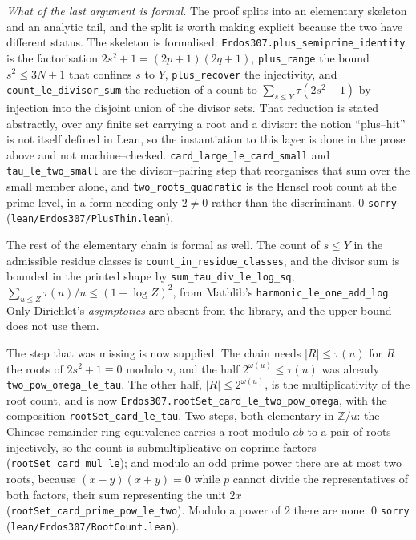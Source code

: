 \documentclass[11pt]{article}
\theoremstyle{definition}
\begin{document}
\emph{What of the last argument is formal.} The proof splits into an elementary skeleton and an analytic tail, and the split is worth making
explicit because the two have different status. The skeleton is formalised:
\texttt{Erdos307.plus\_semiprime\_identity} is the factorisation $2s^2+1=(2p+1)(2q+1)$,
\texttt{plus\_range} the bound $s^2\le3N+1$ that confines $s$ to $Y$, \texttt{plus\_recover} the
injectivity, and \texttt{count\_le\_divisor\_sum} the reduction of a count to
$\sum_{s\le Y}\tau(2s^2+1)$ by injection into the disjoint union of the divisor sets. That reduction
is stated abstractly, over any finite set carrying a root and a divisor: the notion ``plus--hit''
is not itself defined in Lean, so the instantiation to this layer is done in the prose above and not
machine--checked. \texttt{card\_large\_le\_card\_small} and \texttt{tau\_le\_two\_small} are the
divisor--pairing step that reorganises that sum over the small member alone, and
\texttt{two\_roots\_quadratic} is the Hensel root count at the prime level, in a form needing only
$2\ne0$ rather than the discriminant. $0$ \texttt{sorry}
\textup{(\texttt{lean/Erdos307/PlusThin.lean})}.

The rest of the elementary chain is formal as well. The count of $s\le Y$ in the admissible residue
classes is \texttt{count\_in\_residue\_classes}, and the divisor sum is bounded in the printed shape
by \texttt{sum\_tau\_div\_le\_log\_sq}, $\sum_{u\le Z}\tau(u)/u\le(1+\log Z)^2$, from Mathlib's
\texttt{harmonic\_le\_one\_add\_log}. Only Dirichlet's \emph{asymptotics} are absent from the
library, and the upper bound does not use them.

The step that was missing is now supplied. The chain needs $|R|\le\tau(u)$ for $R$ the roots of
$2s^2+1\equiv0$ modulo $u$, and the half $2^{\omega(u)}\le\tau(u)$ was already
\texttt{two\_pow\_omega\_le\_tau}. The other half, $|R|\le2^{\omega(u)}$, is the multiplicativity of
the root count, and is now \texttt{Erdos307.rootSet\_card\_le\_two\_pow\_omega}, with the
composition \texttt{rootSet\_card\_le\_tau}. Two steps, both elementary in $\mathbb{Z}/u$: the
Chinese remainder ring equivalence carries a root modulo $ab$ to a pair of roots injectively, so the
count is submultiplicative on coprime factors \textup{(}\texttt{rootSet\_card\_mul\_le}\textup{)};
and modulo an odd prime power there are at most two roots, because $(x-y)(x+y)=0$ while $p$ cannot
divide the representatives of both factors, their sum representing the unit $2x$
\textup{(}\texttt{rootSet\_card\_prime\_pow\_le\_two}\textup{)}. Modulo a power of $2$ there are
none. $0$ \texttt{sorry} \textup{(\texttt{lean/Erdos307/RootCount.lean})}.
\end{document}
